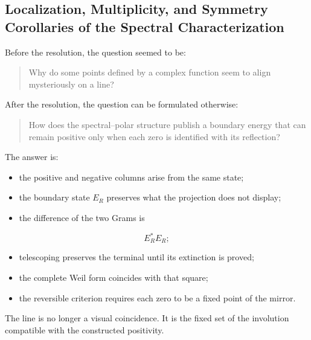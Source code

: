 \subsection{Localization, Multiplicity, and Symmetry Corollaries of the Spectral Characterization}
Before the resolution, the question seemed to be:\par
\begin{quote}
Why do some points defined by a complex function seem to align mysteriously on a line?\par
\end{quote}
After the resolution, the question can be formulated otherwise:\par
\begin{quote}
How does the spectral–polar structure publish a boundary energy that can remain positive only when each zero is identified with its reflection?\par
\end{quote}
The answer is:\par
\begin{itemize}
\item the positive and negative columns arise from the same state;
\item the boundary state \(E_R\) preserves what the projection does not display;
\item the difference of the two Grams is
\end{itemize}
\[
E_R^*E_R;
\]
\begin{itemize}
\item telescoping preserves the terminal until its extinction is proved;
\item the complete Weil form coincides with that square;
\item the reversible criterion requires each zero to be a fixed point of the mirror.
\end{itemize}
The line is no longer a visual coincidence. It is the fixed set of the involution compatible with the constructed positivity.\par
{}
